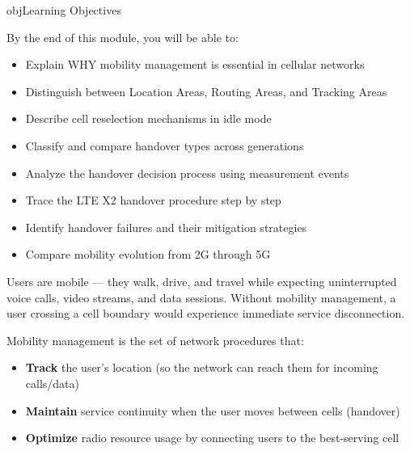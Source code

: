 \begin{CNbox}[unbreakable]{obj}{Learning Objectives}

By the end of this module, you will be able to:

\begin{itemize}
\tightlist
\item
  Explain WHY mobility management is essential in cellular networks
\item
  Distinguish between Location Areas, Routing Areas, and Tracking Areas
\item
  Describe cell reselection mechanisms in idle mode
\item
  Classify and compare handover types across generations
\item
  Analyze the handover decision process using measurement events
\item
  Trace the LTE X2 handover procedure step by step
\item
  Identify handover failures and their mitigation strategies
\item
  Compare mobility evolution from 2G through 5G
\end{itemize}

\end{CNbox}



\CNchained{}

Users are mobile — they walk, drive, and travel while expecting uninterrupted voice calls, video streams, and data sessions. Without mobility management, a user crossing a cell boundary would experience immediate service disconnection.


Mobility management is the set of network procedures that:

\begin{itemize}
\tightlist
\item
  \textbf{Track} the user’s location (so the network can reach them for incoming calls/\allowbreak{}data)
\item
  \textbf{Maintain} service continuity when the user moves between cells (handover)
\item
  \textbf{Optimize} radio resource usage by connecting users to the best-serving cell
\end{itemize}


